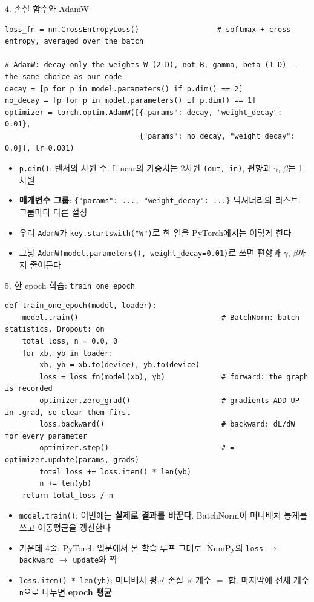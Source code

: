 \documentclass[aspectratio=169,11pt]{beamer}
\newcommand{\code}[1]{\texttt{#1}}
\begin{document}
\begin{frame}[fragile]{4. 손실 함수와 AdamW}
\begin{lstlisting}
loss_fn = nn.CrossEntropyLoss()                  # softmax + cross-entropy, averaged over the batch

# AdamW: decay only the weights W (2-D), not B, gamma, beta (1-D) -- the same choice as our code
decay = [p for p in model.parameters() if p.dim() == 2]
no_decay = [p for p in model.parameters() if p.dim() == 1]
optimizer = torch.optim.AdamW([{"params": decay, "weight_decay": 0.01},
                               {"params": no_decay, "weight_decay": 0.0}], lr=0.001)
\end{lstlisting}
\begin{itemize}
\item \code{p.dim()}: 텐서의 차원 수. Linear의 가중치는 2차원 \code{(out, in)}, 편향과 $\gamma$, $\beta$는 1차원
\item \textbf{매개변수 그룹}: \code{\{"params": ..., "weight\_decay": ...\}} 딕셔너리의 리스트. 그룹마다 다른 설정
\item 우리 \code{AdamW}가 \code{key.startswith("W")}로 한 일을 PyTorch에서는 이렇게 한다
\item 그냥 \code{AdamW(model.parameters(), weight\_decay=0.01)}로 쓰면 편향과 $\gamma$, $\beta$까지 줄어든다
\end{itemize}
\end{frame}

\begin{frame}{5. 한 epoch 학습: \code{train\_one\_epoch}}
\small
\begin{lstlisting}
def train_one_epoch(model, loader):
    model.train()                                 # BatchNorm: batch statistics, Dropout: on
    total_loss, n = 0.0, 0
    for xb, yb in loader:
        xb, yb = xb.to(device), yb.to(device)
        loss = loss_fn(model(xb), yb)             # forward: the graph is recorded
        optimizer.zero_grad()                     # gradients ADD UP in .grad, so clear them first
        loss.backward()                           # backward: dL/dW for every parameter
        optimizer.step()                          # = optimizer.update(params, grads)
        total_loss += loss.item() * len(yb)
        n += len(yb)
    return total_loss / n
\end{lstlisting}
\small
\begin{itemize}
\item \code{model.train()}: 이번에는 \textbf{실제로 결과를 바꾼다}. BatchNorm이 미니배치 통계를 쓰고 이동평균을 갱신한다
\item 가운데 4줄: PyTorch 입문에서 본 학습 루프 그대로. NumPy의 \code{loss} $\to$ \code{backward} $\to$ \code{update}와 짝
\item \code{loss.item() * len(yb)}: 미니배치 평균 손실 $\times$ 개수 $=$ 합. 마지막에 전체 개수 \code{n}으로 나누면 \textbf{epoch 평균}
\end{itemize}
\end{frame}
\end{document}
